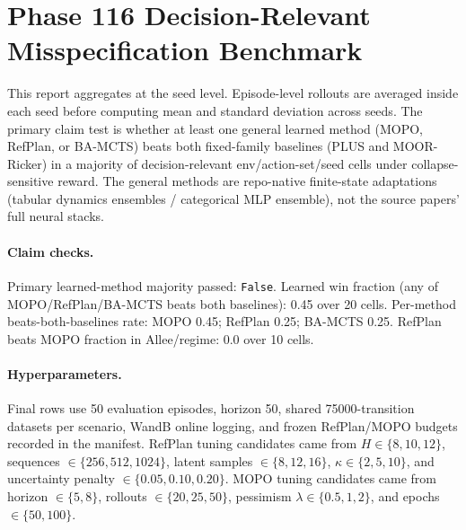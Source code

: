 \documentclass{article}
\begin{document}
\section*{Phase 116 Decision-Relevant Misspecification Benchmark}

This report aggregates at the seed level. Episode-level rollouts are averaged
inside each seed before computing mean and standard deviation across seeds.
The primary claim test is whether at least one general learned method (MOPO,
RefPlan, or BA-MCTS) beats both fixed-family baselines (PLUS and MOOR-Ricker) in
a majority of decision-relevant env/action-set/seed cells under collapse-sensitive
reward. The general methods are repo-native finite-state adaptations (tabular
dynamics ensembles / categorical MLP ensemble), not the source papers' full neural
stacks.

\paragraph{Claim checks.}
Primary learned-method majority passed: \texttt{False}.
Learned win fraction (any of MOPO/RefPlan/BA-MCTS beats both baselines):
0.45 over 20 cells.
Per-method beats-both-baselines rate: MOPO 0.45; RefPlan 0.25; BA-MCTS 0.25.
RefPlan beats MOPO fraction in Allee/regime:
0.0 over 10
cells.

\paragraph{Hyperparameters.}
Final rows use 50 evaluation episodes,
horizon 50, shared
75000-transition datasets per scenario, WandB online
logging, and frozen RefPlan/MOPO budgets recorded in the manifest. RefPlan
tuning candidates came from
$H\in\{8,10,12\}$, sequences $\in\{256,512,1024\}$, latent samples
$\in\{8,12,16\}$, $\kappa\in\{2,5,10\}$, and uncertainty penalty
$\in\{0.05,0.10,0.20\}$. MOPO tuning candidates came from horizon
$\in\{5,8\}$, rollouts $\in\{20,25,50\}$, pessimism $\lambda\in\{0.5,1,2\}$,
and epochs $\in\{50,100\}$.
\end{document}
